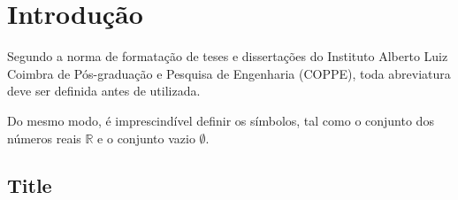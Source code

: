\chapter{Introdução}

Segundo a norma de formata{\c c}\~ao de teses e disserta{\c c}\~oes do
Instituto Alberto Luiz Coimbra de P\'os-gradua{\c c}\~ao e Pesquisa de
Engenharia (COPPE), toda abreviatura deve ser definida antes de
utilizada.

Do mesmo modo, \'e imprescind\'ivel definir os s\'imbolos, tal como o
conjunto dos n\'umeros reais $\mathbb{R}$ e o conjunto vazio $\emptyset$.

\section{Title}



